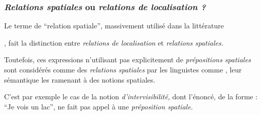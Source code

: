 \subsubsection{\emph{Relations spatiales} ou \emph{relations de
    localisation ?}}

Le terme de \enquote{relation spatiale}, massivement utilisé dans la
littérature 

\textcite{Duchene2019}, fait la distinction entre \emph{relations de
  localisation} et \emph{relations spatiales.}

Toutefois, ces expressions n'utilisant pas explicitement de
\emph{prépositions spatiales} sont considérés comme des
\emph{relations spatiales} par les linguistes comme
\textcite{Vandeloise1986}, leur sémantique les ramenant à des notions
spatiales.

C'est par exemple le cas de la notion \emph{d'intervisibilité,} dont
l'énoncé, de la forme : \enquote{Je vois un lac}, ne fait pas appel à
une \emph{préposition spatiale.}


